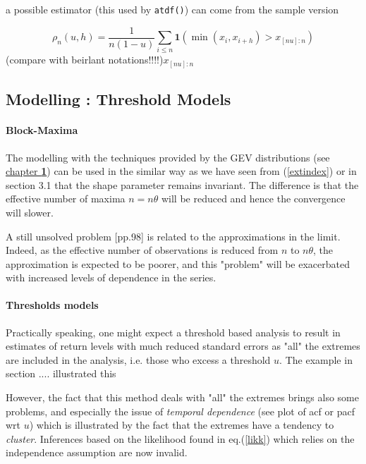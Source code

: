 \documentclass[11pt,a4paper,openany ]{book}
\begin{document}
a possible estimator (this used by \texttt{atdf()}) can come from the sample version 

\begin{equation}\label{autotailsample}
\rho_n(u,h)=\frac{1}{n(1-u)}\sum_{i\leq n}\mathbf{ 1}(\min (x_i,x_{i+h})>x_{[nu]:n})
\end{equation}
(compare with beirlant notations!!!!)$x_{[nu]:n}$


\subsection{Modelling : Threshold Models}

\paragraph{Block-Maxima}
The modelling with the techniques provided by the GEV distributions (see 
\hyperref[sec::1]{chapter \textbf{1}}) can be used in 
the similar way as we have seen from (\ref{extindex}) or in section 3.1 that the shape 
parameter remains invariant. The difference is that the effective number of maxima 
$n=n\theta$ 
will be reduced and hence the convergence will slower. 

A still unsolved problem \cite{coles_introduction_2001}[pp.98] is related to the 
approximations in the limit.
Indeed, as the effective number of observations is reduced from $n$ to $n\theta$, the approximation is expected to be poorer, and this "problem" will be exacerbated
with increased levels of dependence in the series.

\paragraph{Thresholds models}

Practically speaking, one might expect a threshold based analysis to result in estimates of return levels with much reduced standard errors as "all" the extremes are included in the analysis, i.e. those who excess a threshold $u$. The example in section .... illustrated this

However, the fact that this method deals with "all" the extremes brings also some problems, 
and especially the issue of \textit{temporal dependence} (see plot of acf or pacf wrt $u$) 
which is illustrated by the fact that the extremes have a tendency to \emph{cluster}. 
Inferences based on the likelihood found in eq.(\ref{likk}) which relies on the 
independence assumption are now invalid.
\end{document}

